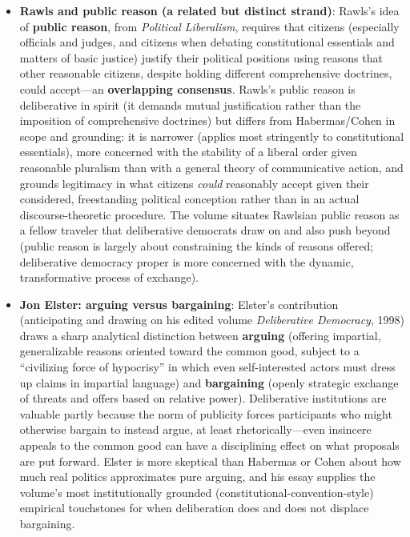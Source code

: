 \documentclass[12pt]{article}
\begin{document}
\begin{itemize}[leftmargin=*, itemsep=4pt]
    \item \textbf{Rawls and public reason (a related but distinct strand)}: Rawls's idea of \textbf{public reason}, from \textit{Political Liberalism}, requires that citizens (especially officials and judges, and citizens when debating constitutional essentials and matters of basic justice) justify their political positions using reasons that other reasonable citizens, despite holding different comprehensive doctrines, could accept---an \textbf{overlapping consensus}. Rawls's public reason is deliberative in spirit (it demands mutual justification rather than the imposition of comprehensive doctrines) but differs from Habermas/Cohen in scope and grounding: it is narrower (applies most stringently to constitutional essentials), more concerned with the stability of a liberal order given reasonable pluralism than with a general theory of communicative action, and grounds legitimacy in what citizens \emph{could} reasonably accept given their considered, freestanding political conception rather than in an actual discourse-theoretic procedure. The volume situates Rawlsian public reason as a fellow traveler that deliberative democrats draw on and also push beyond (public reason is largely about constraining the kinds of reasons offered; deliberative democracy proper is more concerned with the dynamic, transformative process of exchange).
    \item \textbf{Jon Elster: arguing versus bargaining}: Elster's contribution (anticipating and drawing on his edited volume \textit{Deliberative Democracy}, 1998) draws a sharp analytical distinction between \textbf{arguing} (offering impartial, generalizable reasons oriented toward the common good, subject to a ``civilizing force of hypocrisy'' in which even self-interested actors must dress up claims in impartial language) and \textbf{bargaining} (openly strategic exchange of threats and offers based on relative power). Deliberative institutions are valuable partly because the norm of publicity forces participants who might otherwise bargain to instead argue, at least rhetorically---even insincere appeals to the common good can have a disciplining effect on what proposals are put forward. Elster is more skeptical than Habermas or Cohen about how much real politics approximates pure arguing, and his essay supplies the volume's most institutionally grounded (constitutional-convention-style) empirical touchstones for when deliberation does and does not displace bargaining.

\end{itemize}
\end{document}

